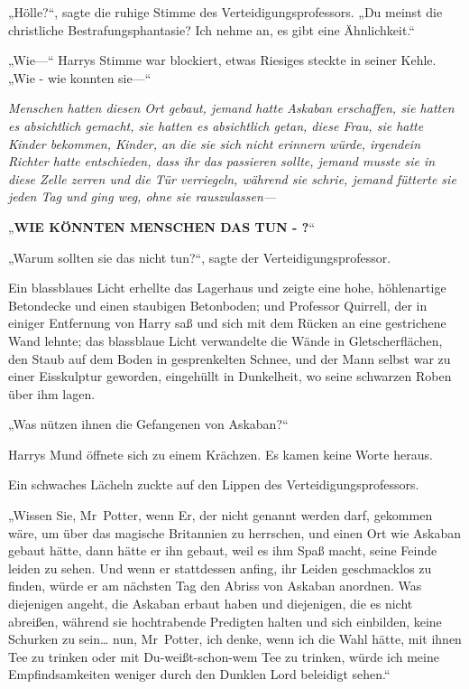 {„Hölle?“, sagte die ruhige Stimme des Verteidigungsprofessors. „Du meinst die christliche Bestrafungsphantasie? Ich nehme an, es gibt eine Ähnlichkeit.“

„Wie—“ Harrys Stimme war blockiert, etwas Riesiges steckte in seiner Kehle. „Wie - wie konnten sie—“

\emph{Menschen hatten diesen Ort gebaut, jemand hatte Askaban erschaffen, sie hatten es absichtlich gemacht, sie hatten es absichtlich getan, diese Frau, sie hatte Kinder bekommen, Kinder, an die sie sich nicht erinnern würde, irgendein Richter hatte} \emph{entschieden, dass ihr das passieren sollte, jemand musste sie in diese Zelle zerren und die Tür verriegeln, während sie schrie, jemand fütterte sie} \emph{jeden Tag und ging weg, ohne sie rauszulassen—}

„\textbf{WIE KÖNNTEN MENSCHEN DAS TUN - ?}“

„Warum sollten sie das nicht tun?“, sagte der Verteidigungsprofessor.

Ein blassblaues Licht erhellte das Lagerhaus und zeigte eine hohe, höhlenartige Betondecke und einen staubigen Betonboden; und Professor Quirrell, der in einiger Entfernung von Harry saß und sich mit dem Rücken an eine gestrichene Wand lehnte; das blassblaue Licht verwandelte die Wände in Gletscherflächen, den Staub auf dem Boden in gesprenkelten Schnee, und der Mann selbst war zu einer Eisskulptur geworden, eingehüllt in Dunkelheit, wo seine schwarzen Roben über ihm lagen.

„Was nützen ihnen die Gefangenen von Askaban?“

Harrys Mund öffnete sich zu einem Krächzen. Es kamen keine Worte heraus.

Ein schwaches Lächeln zuckte auf den Lippen des Verteidigungsprofessors.

„Wissen Sie, Mr~Potter, wenn Er, der nicht genannt werden darf, gekommen wäre, um über das magische Britannien zu herrschen, und einen Ort wie Askaban gebaut hätte, dann hätte er ihn gebaut, weil es ihm Spaß macht, seine Feinde leiden zu sehen. Und wenn er stattdessen anfing, ihr Leiden geschmacklos zu finden, würde er am nächsten Tag den Abriss von Askaban anordnen. Was diejenigen angeht, die Askaban erbaut haben und diejenigen, die es nicht abreißen, während sie hochtrabende Predigten halten und sich einbilden, keine Schurken zu sein… nun, Mr~Potter, ich denke, wenn ich die Wahl hätte, mit ihnen Tee zu trinken oder mit Du-weißt-schon-wem Tee zu trinken, würde ich meine Empfindsamkeiten weniger durch den Dunklen Lord beleidigt sehen.“

}
